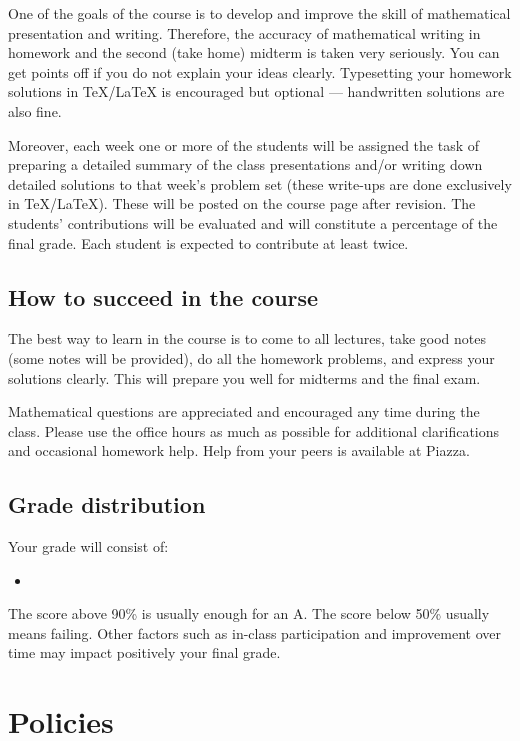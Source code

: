 \documentclass[oneside,11pt]{amsart}
\begin{document}
One of the goals of the course is to develop and improve 
the skill of mathematical presentation and writing. 
Therefore, the accuracy of mathematical writing
in homework and the second (take home) midterm 
is taken very seriously. You can get points off
if you do not explain your ideas clearly. 
Typesetting your homework solutions in \TeX/\LaTeX{} is encouraged
but optional --- handwritten solutions are also fine.

Moreover, each week one or more of the students will be assigned the task of
preparing a detailed summary of the class presentations and/or writing down
detailed solutions to that week’s problem set (these write-ups are done
exclusively in \TeX/\LaTeX{}). These will be posted on the
course page after revision. The students' contributions will be evaluated and
will constitute a percentage of the final grade. Each student is expected
to contribute at least twice.

\subsection{How to succeed in the course}

The best way to learn in the course is to come to all lectures, take good notes
(some notes will be provided),
do all the homework problems, and express your solutions 
clearly. 
This will prepare you well for midterms and the final exam.

Mathematical questions are appreciated and encouraged any time during the
class. Please use the office hours as much as possible for additional
clarifications and occasional homework help.
Help from your peers is available at Piazza.

\subsection{Grade distribution}

Your grade will consist of:
\begin{itemize}
	\item 
\end{itemize}

The score above 90\% is usually enough for an A. 
The score below 50\% usually means failing. 
Other factors such as in-class participation 
and improvement over time may impact positively your final grade.

\section{Policies}
\end{document}

